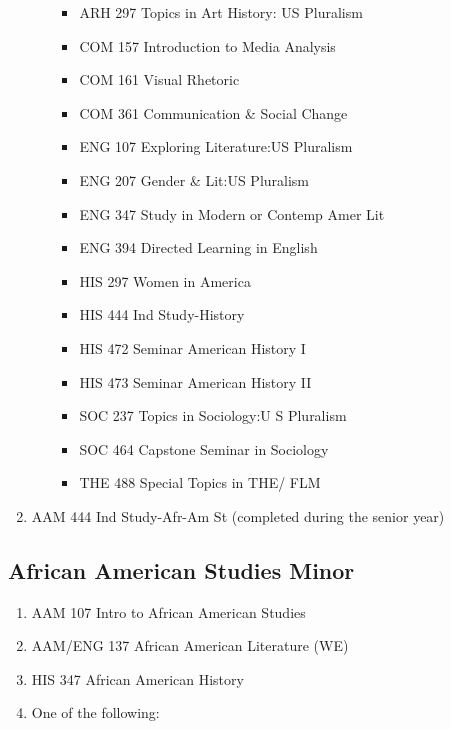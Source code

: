 \documentclass[
  letterpaper,
]{scrbook}
\providecommand{\tightlist}{%
  \setlength{\itemsep}{0pt}\setlength{\parskip}{0pt}}
\begin{document}
\begin{enumerate}
\begin{itemize}
    \begin{itemize}
    \tightlist
    \item
      ARH 297 Topics in Art History: US Pluralism
    \item
      COM 157 Introduction to Media Analysis
    \item
      COM 161 Visual Rhetoric
    \item
      COM 361 Communication \& Social Change
    \item
      ENG 107 Exploring Literature:US Pluralism
    \item
      ENG 207 Gender \& Lit:US Pluralism
    \item
      ENG 347 Study in Modern or Contemp Amer Lit
    \item
      ENG 394 Directed Learning in English
    \item
      HIS 297 Women in America
    \item
      HIS 444 Ind Study-History
    \item
      HIS 472 Seminar American History I
    \item
      HIS 473 Seminar American History II
    \item
      SOC 237 Topics in Sociology:U S Pluralism
    \item
      SOC 464 Capstone Seminar in Sociology
    \item
      THE 488 Special Topics in THE/ FLM
    \end{itemize}
  \end{itemize}
\item
  AAM 444 Ind Study-Afr-Am St (completed during the senior year)
\end{enumerate}

\subsection{African American Studies
Minor}\label{african-american-studies-minor}

\begin{enumerate}
\def\labelenumi{\arabic{enumi}.}
\tightlist
\item
  AAM 107 Intro to African American Studies\\
\item
  AAM/ENG 137 African American Literature (WE)
\item
  HIS 347 African American History\\
\item
  One of the following:
\end{enumerate}
\end{document}
